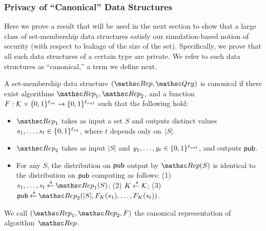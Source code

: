 \subsubsection{Privacy of ``Canonical'' Data Structures }
Here we prove a result that will be used in the next section
to show that a large class of
set-membership
data structures satisfy our simulation-based notion of security
(with respect to leakage of the size of the set). Specifically, we prove that
all such data structures of a certain type are private. We refer to such data structures
as ``canonical,'' a term we define next.




\begin{definition}
A set-membership data structure $(\Rep, \Qry)$ is {\sf canonical} if
there exist algorithms $\Rep_1, \Rep_2$, and a function
$F: {\cal K} \times \{0,1\}^{\ell_{in}} \rightarrow \{0,1\}^{\ell_{out}}$
such that the following hold:
\begin{itemize}
\item $\Rep_1$ takes as input a set $S$ and outputs distinct values $s_1, \ldots, s_t \in \{0,1\}^{\ell_{in}}$,
where $t$ depends only on~$|S|$.
\item $\Rep_2$ takes as input $|S|$ and $y_1, \ldots, y_t \in \{0,1\}^{\ell_{out}}$, and outputs
${\sf pub}$.
\item For any $S$, the distribution on ${\sf pub}$ output by $\Rep(S)$ is identical to the distribution
on ${\sf pub}$ computing as follows:
(1) $s_1, \ldots, s_t \getsr \Rep_1(S)$;
(2) $K {\:\stackrel{{\scriptscriptstyle \hspace{0.2em}\$}} {\leftarrow}\:} {\cal K}$;
(3) $\pubaux \getsr \Rep_2(|S|, F_{K}(s_1), \ldots,F_{K}(s_t))$.
\end{itemize}
We call $(\Rep_1, \Rep_2, F)$ the {\sf canonical representation}
of algorithm~$\Rep$. \hfill\dqed
\end{definition}



